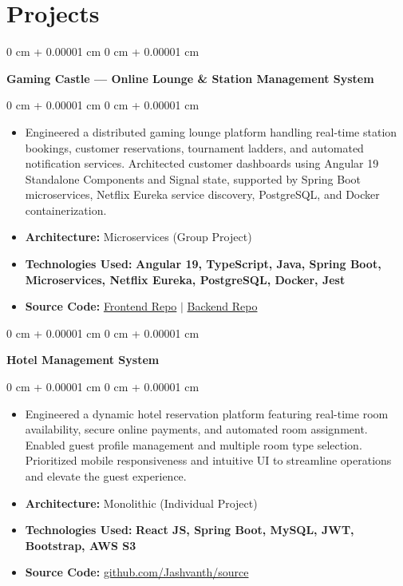 \documentclass[10pt, letterpaper]{article}
\newenvironment{highlights}{
    \begin{itemize}[
        topsep=0.08 cm,
        parsep=0.08 cm,
        partopsep=0pt,
        itemsep=0pt,
        leftmargin=0 cm + 10pt
    ]
}{
    \end{itemize}
} %
\newenvironment{onecolentry}{
    \begin{adjustwidth}{
        0 cm + 0.00001 cm
    }{
        0 cm + 0.00001 cm
    }
}{
    \end{adjustwidth}
} %
\begin{document}
    \section{Projects}

    \begin{onecolentry}
        \textbf{Gaming Castle — Online Lounge \& Station Management System}
    \end{onecolentry}

    \vspace{0.10 cm}
    \begin{onecolentry}
        \begin{highlights}
            \item Engineered a distributed gaming lounge platform handling real-time station bookings, customer reservations, tournament ladders, and automated notification services. Architected customer dashboards using Angular 19 Standalone Components and Signal state, supported by Spring Boot microservices, Netflix Eureka service discovery, PostgreSQL, and Docker containerization.
            \item \textbf{Architecture:} Microservices (Group Project)
            \item \textbf{Technologies Used:} \textbf{Angular 19, TypeScript, Java, Spring Boot, Microservices, Netflix Eureka, PostgreSQL, Docker, Jest}
            \item \textbf{Source Code:} \href{https://github.com/SENG34213/frontend}{Frontend Repo} $|$ \href{https://github.com/SENG34213/backend}{Backend Repo}
        \end{highlights}
    \end{onecolentry}

    \vspace{0.10 cm}

    \begin{onecolentry}
        \textbf{Hotel Management System}
    \end{onecolentry}

        \vspace{0.10 cm}
        \begin{onecolentry}
            \begin{highlights}
                \item Engineered a dynamic hotel reservation platform featuring real-time room availability, secure online payments, and automated room assignment. Enabled guest profile management and multiple room type selection. Prioritized mobile responsiveness and intuitive UI to streamline operations and elevate the guest experience.
                \item \textbf{Architecture:} Monolithic (Individual Project) 
                \item \textbf{Technologies Used:} \textbf{React JS, Spring Boot, MySQL, JWT, Bootstrap, AWS S3}
                \item \textbf{Source Code:} \href{https://github.com/jashvanth370/Hotel_Management}{github.com/Jashvanth/source}
            \end{highlights}
        \end{onecolentry}
\end{document}
